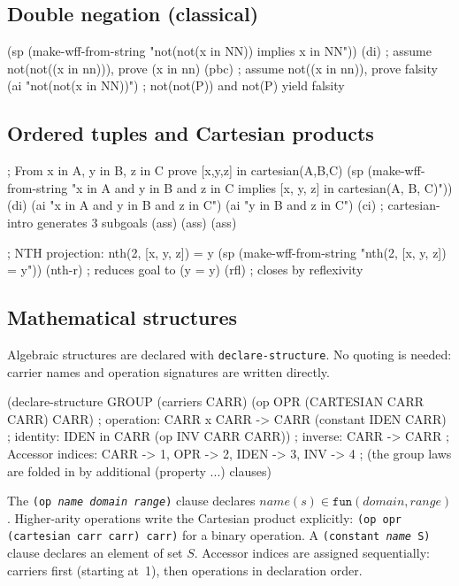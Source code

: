 \subsection{Double negation (classical)}

\begin{VNBcode}
(sp (make-wff-from-string "not(not(x in NN)) implies x in NN"))
(di)                              ; assume not(not((x in nn))), prove (x in nn)
(pbc)                             ; assume not((x in nn)), prove falsity
(ai "not(not(x in NN))")         ; not(not(P)) and not(P) yield falsity
\end{VNBcode}

\subsection{Ordered tuples and Cartesian products}

\begin{VNBcode}
; From x in A, y in B, z in C prove [x,y,z] in cartesian(A,B,C)
(sp (make-wff-from-string
      "x in A and y in B and z in C implies [x, y, z] in cartesian(A, B, C)"))
(di)
(ai "x in A and y in B and z in C")
(ai "y in B and z in C")
(ci)              ; cartesian-intro generates 3 subgoals
(ass) (ass) (ass)

; NTH projection: nth(2, [x, y, z]) = y
(sp (make-wff-from-string "nth(2, [x, y, z]) = y"))
(nth-r)           ; reduces goal to (y = y)
(rfl)             ; closes by reflexivity
\end{VNBcode}

\subsection{Mathematical structures}

Algebraic structures are declared with \texttt{declare-structure}.
No quoting is needed: carrier names and operation signatures are written
directly.

\begin{VNBcode}
(declare-structure GROUP
  (carriers CARR)
  (op OPR (CARTESIAN CARR CARR) CARR)  ; operation: CARR x CARR -> CARR
  (constant IDEN CARR)                 ; identity: IDEN in CARR
  (op INV CARR CARR))                  ; inverse: CARR -> CARR
; Accessor indices: CARR -> 1, OPR -> 2, IDEN -> 3, INV -> 4
; (the group laws are folded in by additional (property ...) clauses)
\end{VNBcode}

\begin{sloppypar}The \texttt{(op \textit{name} \textit{domain} \textit{range})} clause declares
$\textit{name}(s) \in \texttt{fun}(\textit{domain}, \textit{range})$.
Higher-arity operations write the Cartesian product explicitly:
\texttt{(op opr (cartesian carr carr) carr)} for a binary operation.
A \texttt{(constant \textit{name} S)} clause declares an element of set $S$.
Accessor indices are assigned sequentially: carriers first (starting
at~1), then operations in declaration order.\end{sloppypar}

